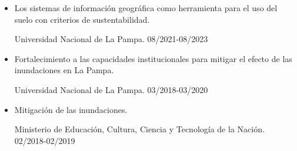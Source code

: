 \documentclass[9.5pt,a4paper,ragged2e, normalphoto]{altacv}
\begin{document}

\begin{itemize}
 \item {Los sistemas de información geográfica como herramienta para el uso del suelo con criterios de sustentabilidad. 
 
Universidad Nacional de La Pampa. 08/2021-08/2023}

\item {Fortalecimiento a las capacidades institucionales para mitigar el efecto de las inundaciones en La Pampa. 
 
Universidad Nacional de La Pampa. 03/2018-03/2020}

\item {Mitigación de las inundaciones. 
 
Ministerio de Educación, Cultura, Ciencia y Tecnología de la Nación. 02/2018-02/2019}
\end{itemize}
\end{document}
